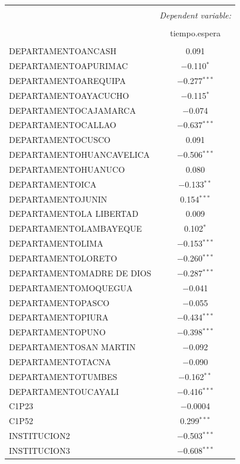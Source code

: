 \documentclass{article}
\begin{document}
\begin{tabular}{@{\extracolsep{5pt}}lc}
\\[-1.8ex]\hline
\hline \\[-1.8ex]
 & \multicolumn{1}{c}{\textit{Dependent variable:}} \\
\cline{2-2}
\\[-1.8ex] & tiempo.espera \\
\hline \\[-1.8ex]
 DEPARTAMENTOANCASH & 0.091 \\
 DEPARTAMENTOAPURIMAC & $-$0.110$^{*}$ \\
 DEPARTAMENTOAREQUIPA & $-$0.277$^{***}$ \\
 DEPARTAMENTOAYACUCHO & $-$0.115$^{*}$ \\
 DEPARTAMENTOCAJAMARCA & $-$0.074 \\
 DEPARTAMENTOCALLAO & $-$0.637$^{***}$ \\
 DEPARTAMENTOCUSCO & 0.091 \\
 DEPARTAMENTOHUANCAVELICA & $-$0.506$^{***}$ \\
 DEPARTAMENTOHUANUCO & 0.080 \\
 DEPARTAMENTOICA & $-$0.133$^{**}$ \\
 DEPARTAMENTOJUNIN & 0.154$^{***}$ \\
 DEPARTAMENTOLA LIBERTAD & 0.009 \\
 DEPARTAMENTOLAMBAYEQUE & 0.102$^{*}$ \\
 DEPARTAMENTOLIMA & $-$0.153$^{***}$ \\
 DEPARTAMENTOLORETO & $-$0.260$^{***}$ \\
 DEPARTAMENTOMADRE DE DIOS & $-$0.287$^{***}$ \\
 DEPARTAMENTOMOQUEGUA & $-$0.041 \\
 DEPARTAMENTOPASCO & $-$0.055 \\
 DEPARTAMENTOPIURA & $-$0.434$^{***}$ \\
 DEPARTAMENTOPUNO & $-$0.398$^{***}$ \\
 DEPARTAMENTOSAN MARTIN & $-$0.092 \\
 DEPARTAMENTOTACNA & $-$0.090 \\
 DEPARTAMENTOTUMBES & $-$0.162$^{**}$ \\
 DEPARTAMENTOUCAYALI & $-$0.416$^{***}$ \\
 C1P23 & $-$0.0004 \\
 C1P52 & 0.299$^{***}$ \\
 INSTITUCION2 & $-$0.503$^{***}$ \\
 INSTITUCION3 & $-$0.608$^{***}$ \\

\end{tabular}
\end{document}
